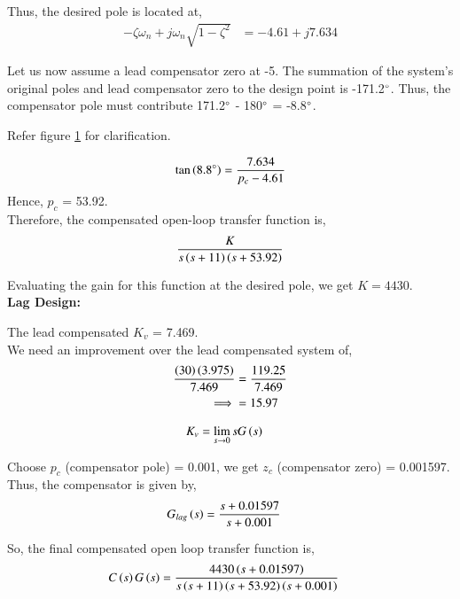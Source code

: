 Thus, the desired pole is located at,
\begin{align}
    -\zeta\omega_n + j\omega_n\sqrt{1-\zeta^2} &= -4.61 + j7.634
\end{align}

Let us now assume a lead compensator zero at -5. The summation of the system's original poles and lead compensator zero to the design point is -171.2$\degree$. Thus, the compensator pole must contribute 171.2$\degree$ - 180$\degree$ = -8.8$\degree$.

\begin{figure}[!ht]
 \centering
    \resizebox{\columnwidth}{!}{}
    \caption{}
    \label{fig:ep18btech11016_graph}
\end{figure}

Refer figure \ref{fig:ep18btech11016_graph} for clarification.

\begin{align}
    \tan\left(8.8\degree\right) = \frac{7.634}{p_c - 4.61}
\end{align}
Hence, $p_c$ = 53.92.\\
Therefore, the compensated open-loop transfer function is,
\begin{align}
    \frac{K}{s\left(s+11\right)\left(s+53.92\right)}
\end{align}

Evaluating the gain for this function at the desired pole, we get $K = 4430$.\\

\textbf{Lag Design:}

The lead compensated $K_v$ = 7.469.\\
We need an improvement over the lead compensated system of,
\begin{align}
    \frac{\left(30\right)\left(3.975\right)}{7.469} &= \frac{119.25}{7.469}\\
    \implies &= 15.97
\end{align}

\begin{align}
K_v &= \lim_{s \to 0} s G\left(s\right) 
\end{align}

Choose $p_c$ (compensator pole) = 0.001, we get $z_c$ (compensator zero) = 0.001597.
Thus, the compensator is given by, 
\begin{align}
    G_{lag}\left(s\right) &= \frac{s+0.01597}{s+0.001}
\end{align}

So, the final compensated open loop transfer function is,
\begin{align}
    C\left(s\right) G\left(s\right) &= \frac{4430\left(s+0.01597\right)}{s\left(s+11\right)\left(s+53.92\right)\left(s+0.001\right)}
\end{align}

